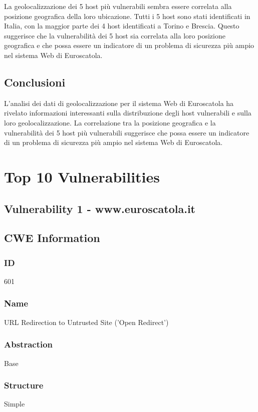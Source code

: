 La geolocalizzazione dei 5 host più vulnerabili sembra essere correlata alla posizione geografica della loro ubicazione. Tutti i 5 host sono stati identificati in Italia, con la maggior parte dei 4 host identificati a Torino e Brescia. Questo suggerisce che la vulnerabilità dei 5 host sia correlata alla loro posizione geografica e che possa essere un indicatore di un problema di sicurezza più ampio nel sistema Web di Euroscatola.

\section{Conclusioni}

L'analisi dei dati di geolocalizzazione per il sistema Web di Euroscatola ha rivelato informazioni interessanti sulla distribuzione degli host vulnerabili e sulla loro geolocalizzazione. La correlazione tra la posizione geografica e la vulnerabilità dei 5 host più vulnerabili suggerisce che possa essere un indicatore di un problema di sicurezza più ampio nel sistema Web di Euroscatola.



\chapter{Top 10 Vulnerabilities}

\section*{Vulnerability 1 - www.euroscatola.it}

\section*{CWE Information}
\subsection*{ID}
601

\subsection*{Name}
URL Redirection to Untrusted Site ('Open Redirect')

\subsection*{Abstraction}
Base

\subsection*{Structure}
Simple

